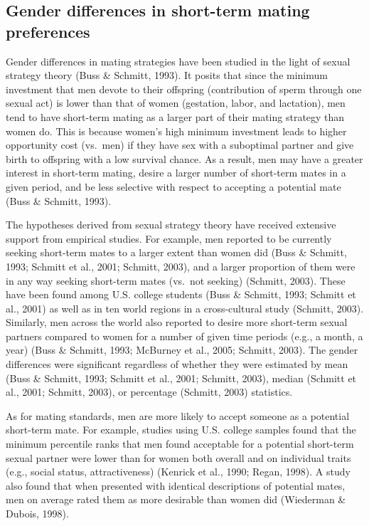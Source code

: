 \documentclass[
  11pt,
]{article}
\begin{document}
\hypertarget{gender-differences-in-short-term-mating-preferences}{%
\subsection{Gender differences in short-term mating
preferences}\label{gender-differences-in-short-term-mating-preferences}}

Gender differences in mating strategies have been studied in the light
of sexual strategy theory (Buss \& Schmitt, 1993). It posits that since
the minimum investment that men devote to their offspring (contribution
of sperm through one sexual act) is lower than that of women (gestation,
labor, and lactation), men tend to have short-term mating as a larger
part of their mating strategy than women do. This is because women's
high minimum investment leads to higher opportunity cost (vs.~men) if
they have sex with a suboptimal partner and give birth to offspring with
a low survival chance. As a result, men may have a greater interest in
short-term mating, desire a larger number of short-term mates in a given
period, and be less selective with respect to accepting a potential mate
(Buss \& Schmitt, 1993).

The hypotheses derived from sexual strategy theory have received
extensive support from empirical studies. For example, men reported to
be currently seeking short-term mates to a larger extent than women did
(Buss \& Schmitt, 1993; Schmitt et al., 2001; Schmitt, 2003), and a
larger proportion of them were in any way seeking short-term mates
(vs.~not seeking) (Schmitt, 2003). These have been found among U.S.
college students (Buss \& Schmitt, 1993; Schmitt et al., 2001) as well
as in ten world regions in a cross-cultural study (Schmitt, 2003).
Similarly, men across the world also reported to desire more short-term
sexual partners compared to women for a number of given time periods
(e.g., a month, a year) (Buss \& Schmitt, 1993; McBurney et al., 2005;
Schmitt, 2003). The gender differences were significant regardless of
whether they were estimated by mean (Buss \& Schmitt, 1993; Schmitt et
al., 2001; Schmitt, 2003), median (Schmitt et al., 2001; Schmitt, 2003),
or percentage (Schmitt, 2003) statistics.

As for mating standards, men are more likely to accept someone as a
potential short-term mate. For example, studies using U.S. college
samples found that the minimum percentile ranks that men found
acceptable for a potential short-term sexual partner were lower than for
women both overall and on individual traits (e.g., social status,
attractiveness) (Kenrick et al., 1990; Regan, 1998). A study also found
that when presented with identical descriptions of potential mates, men
on average rated them as more desirable than women did (Wiederman \&
Dubois, 1998).
\end{document}

